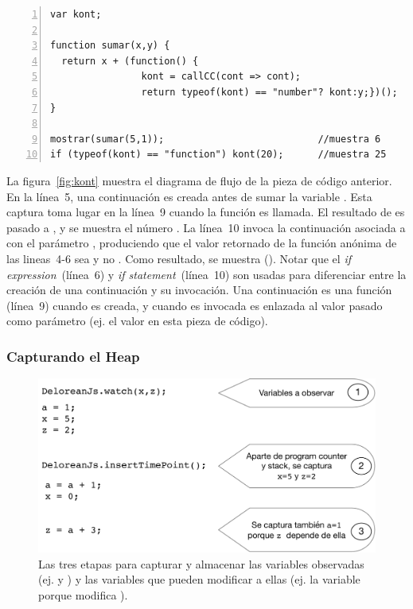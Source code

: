\documentclass[conference]{IEEEtran}
\begin{document}


\begin{lstlisting}[linewidth=\columnwidth,numbers=left]
var kont;

function sumar(x,y) {
  return x + (function() {
                kont = callCC(cont => cont);
                return typeof(kont) == "number"? kont:y;})();
}

mostrar(sumar(5,1));                           //muestra 6
if (typeof(kont) == "function") kont(20);      //muestra 25
\end{lstlisting}

La figura~\ref{fig:kont} muestra el diagrama de flujo de la pieza de c\'odigo anterior. En la l\'inea~5, una continuaci\'on  es creada antes de sumar la variable . Esta captura toma lugar en la l\'inea~9 cuando la funci\'on  es llamada. El resultado de  es pasado a , y se muestra el n\'umero . La l\'inea~10 invoca la continuaci\'on asociada a  con el par\'ametro , produciendo que el valor retornado de la funci\'on an\'onima de las lineas~4-6 sea  y no . Como resultado, se muestra  (). Notar que el {\em if expression}~(l\'inea~6) y {\em if statement}~(l\'inea~10) son usadas para diferenciar entre la creaci\'on de una continuaci\'on y su invocaci\'on. Una continuaci\'on es una funci\'on (l\'inea~9) cuando es creada, y cuando es invocada es enlazada al valor pasado como par\'ametro (ej. el valor  en esta pieza de c\'odigo).         

\bigskip

\subsubsection{Capturando el Heap}
\label{sec:heap}

\begin{figure}[t]
\begin{center}
\includegraphics[width=.8\linewidth]{fig-heap1}
\caption{Las tres etapas para capturar y almacenar las variables observadas (ej.  y ) y las variables que pueden modificar a ellas (ej. la variable  porque modifica ).}
\label{fig:heap1}
\end{center}
\end{figure}
\end{document}
